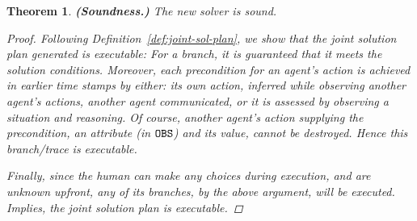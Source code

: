 \documentclass[letterpaper]{article} %
\newtheorem{theorem}{Theorem}[section]
\begin{document}
\begin{theorem}
\textbf{(Soundness.)} The new solver is sound.
\vspace{-0.06in}
\begin{proof}
Following Definition~\ref{def:joint-sol-plan},
we show that the joint solution plan generated is executable:
For a branch, it is guaranteed that it meets the {\em solution conditions}.
Moreover, each precondition for an agent's action is achieved in earlier time stamps by either: its own action, 
\textit{inferred} while observing another agent's actions, 
another agent \textit{communicated},
or it is \textit{assessed} by observing a situation and reasoning.
Of course, another agent’s action supplying the precondition, an attribute (in $\texttt{OBS}$) and its value, cannot be destroyed. 
Hence this branch/trace is executable.

Finally, since the human can make any choices during execution,
and are unknown upfront, any of its branches, by the
above argument, will be executed. 
Implies, the joint solution plan is executable.
\end{proof}
\end{theorem}
\end{document}
